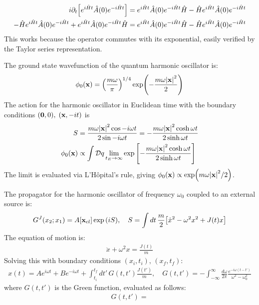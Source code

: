 \documentclass{report}
\begin{document}
\begin{subquests}
    \begin{align*}
        i\partial_t\bqty{e^{i\hat H t}\hat A(0)e^{-i\hat H t}} & = e^{i\hat H t}\hat A(0)e^{-i\hat H t}\hat H - \hat H e^{i\hat H t}\hat A(0)e^{-i\hat H t} \\
        - \hat He^{i\hat H t}\hat A(0)e^{-i\hat H t} + e^{i\hat H t}\hat A(0)e^{-i\hat H t}\hat H & = e^{i\hat H t}\hat A(0)e^{-i\hat H t}\hat H - \hat H e^{i\hat H t}\hat A(0)e^{-i\hat H t}
    \end{align*}
    This works because the operator commutes with its exponential, easily verified by the Taylor series representation.
    \item The ground state wavefunction of the quantum harmonic oscillator is: \begin{gather*}
        \phi_0(\vb x) = \pqty{\frac{m\omega}{\pi}}^{1/4}\exp(-\frac{m\omega\abs{\vb x}^2}{2})
    \end{gather*}
    The action for the harmonic oscillator in Euclidean time with the boundary conditions $(\vb 0, 0),\; (\vb x, -it)$ is
    \begin{align*}
        S & = \frac{m\omega\abs{\vb x}^2\cos -i\omega t}{2\sin -i\omega t} = -\frac{m\omega\abs{\vb x}^2 \cosh \omega t}{2\sinh \omega t}\\ 
        \phi_0(\vb x) & \propto \int \mathcal Dq \lim_{t_E \to \infty}\exp\bqty{-\frac{m\omega\abs{\vb x}^2 \cosh \omega t}{2\sinh \omega t}}
    \end{align*}
    The limit is evaluated via L'H\^{o}pital's rule, giving $\phi_0(\vb x) \propto \exp(m\omega\abs{\vb x}^2/2)$.
    \item The propagator for the harmonic oscillator of frequency $\omega_0$ coupled to an external source is:
    \begin{gather*}
        G^{J}(x_2;x_1) = A[\vb x_{cl}]\exp\pqty{iS}, \quad S = \int dt\, \frac{m}{2}\bqty{\dot x^2 - \omega^2 x^2 + J(t)x}
    \end{gather*}
    The equation of motion is:
    \begin{align*}
        \ddot x + \omega^2 x = \frac{J(t)}{m}
    \end{align*}
    Solving this with boundary conditions $(x_i, t_i),\, (x_f,t_f)$:
    \begin{align*}
        x(t) = Ae^{i\omega t} + Be^{-i\omega t} + \int_{t_i}^{t_f} dt' \,G(t,t')\frac{J(t')}{m}, \quad G(t,t') = -\int_{-\infty}^{\infty} \frac{d\omega}{2\pi}\frac{e^{-i\omega(t - t')}}{\omega^2 - \omega_0^2}
    \end{align*}
    where $G(t,t')$ is the Green function, evaluated as follows:
    \begin{align*}
        G(t,t') = 
    \end{align*}
\end{subquests}
\end{document}
